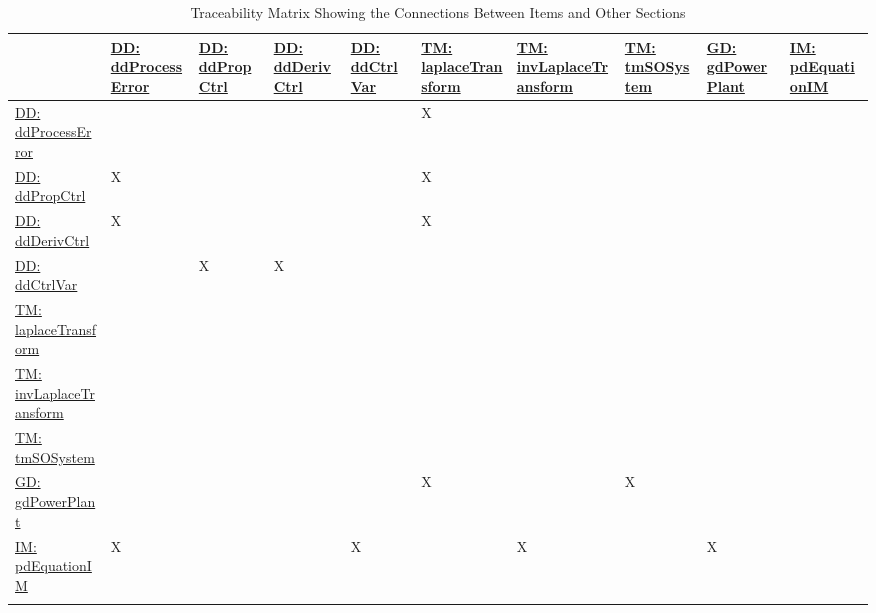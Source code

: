 \documentclass[12pt]{article}
\begin{document}
\begin{longtable}{l l l l l l l l l l}
\toprule
\textbf{} & \textbf{\hyperref[DD:ddProcessError]{DD: ddProcessError}} & \textbf{\hyperref[DD:ddPropCtrl]{DD: ddPropCtrl}} & \textbf{\hyperref[DD:ddDerivCtrl]{DD: ddDerivCtrl}} & \textbf{\hyperref[DD:ddCtrlVar]{DD: ddCtrlVar}} & \textbf{\hyperref[TM:laplaceTransform]{TM: laplaceTransform}} & \textbf{\hyperref[TM:invLaplaceTransform]{TM: invLaplaceTransform}} & \textbf{\hyperref[TM:tmSOSystem]{TM: tmSOSystem}} & \textbf{\hyperref[GD:gdPowerPlant]{GD: gdPowerPlant}} & \textbf{\hyperref[IM:pdEquationIM]{IM: pdEquationIM}}
\\
\midrule
\endhead
\hyperref[DD:ddProcessError]{DD: ddProcessError} &  &  &  &  & X &  &  &  & 
\\
\hyperref[DD:ddPropCtrl]{DD: ddPropCtrl} & X &  &  &  & X &  &  &  & 
\\
\hyperref[DD:ddDerivCtrl]{DD: ddDerivCtrl} & X &  &  &  & X &  &  &  & 
\\
\hyperref[DD:ddCtrlVar]{DD: ddCtrlVar} &  & X & X &  &  &  &  &  & 
\\
\hyperref[TM:laplaceTransform]{TM: laplaceTransform} &  &  &  &  &  &  &  &  & 
\\
\hyperref[TM:invLaplaceTransform]{TM: invLaplaceTransform} &  &  &  &  &  &  &  &  & 
\\
\hyperref[TM:tmSOSystem]{TM: tmSOSystem} &  &  &  &  &  &  &  &  & 
\\
\hyperref[GD:gdPowerPlant]{GD: gdPowerPlant} &  &  &  &  & X &  & X &  & 
\\
\hyperref[IM:pdEquationIM]{IM: pdEquationIM} & X &  &  & X &  & X &  & X & 
\\
\bottomrule
\caption{Traceability Matrix Showing the Connections Between Items and Other Sections}
\label{Table:TraceMatRefvsRef}
\end{longtable}
\end{document}
